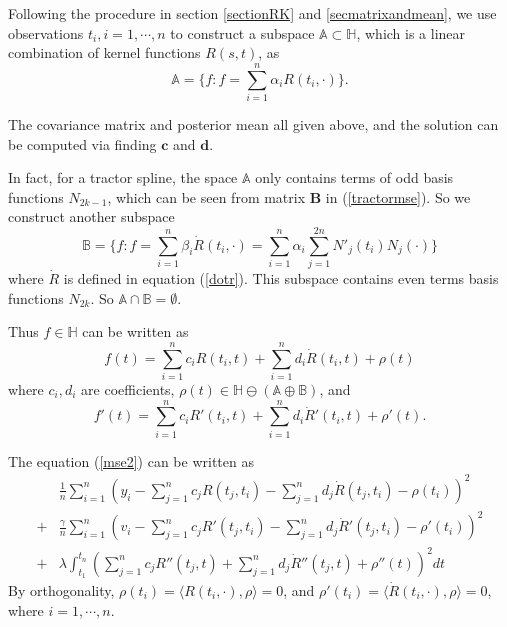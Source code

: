 Following the procedure in section \ref{sectionRK} and \ref{secmatrixandmean}, we use observations $t_i, i=1, \cdots, n$ to construct a subspace $\mathbb{A}\subset\mathbb{H}$, which is a linear combination of kernel functions $R(s,t)$, as
\begin{equation}
\mathbb{A}=\{f: f=\sum_{i=1}^{n}\alpha_iR(t_i,\cdot)\}.
\end{equation}

The covariance matrix and posterior mean all given above, and the solution can be computed via finding $\mathbf{c}$ and $\mathbf{d}$.

In fact, for a tractor spline, the space $\mathbb{A}$ only contains terms of odd basis functions $N_{2k-1}$, which can be seen from matrix $\mathbf{B}$ in (\ref{tractormse}). So we construct another subspace
\begin{equation}
\mathbb{B}=\{f: f=\sum_{i=1}^{n}\beta_i \dot{R}(t_i,\cdot)=\sum_{i=1}^{n}\alpha_i \sum_{j=1}^{2n}N'_j(t_i)N_j(\cdot)\} 
\end{equation}
where $\dot{R}$ is defined in equation (\ref{dotr}). This subspace contains even terms basis functions $N_{2k}$. So $\mathbb{A} \cap \mathbb{B} = \emptyset$. 

Thus $f \in \mathbb{H}$ can be written as
\begin{equation}\label{etaeq3}
f(t)=\sum_{i=1}^{n}c_iR(t_i,t)+\sum_{i=1}^{n}d_i \dot{R}(t_i,t)+\rho(t)
\end{equation}
where $c_i, d_i$ are coefficients, $\rho(t) \in \mathbb{H} \ominus (\mathbb{A} \oplus \mathbb{B})$, and 
\begin{equation}\label{etaeq4}
f'(t)=\sum_{i=1}^{n}c_iR'(t_i,t)+\sum_{i=1}^{n}d_i \dot{R}'(t_i,t)+\rho'(t).
\end{equation}

The equation (\ref{mse2}) can be written as
\begin{equation}
\begin{split}
&\frac{1}{n}\sum_{i=1}^n (y_i -\sum_{j=1}^{n}c_jR(t_j,t_i)- \sum_{j=1}^{n}d_j\dot{R}(t_j,t_i) -\rho(t_i))^2\\
+&\frac{\gamma}{n}\sum_{i=1}^n (v_i -\sum_{j=1}^{n}c_jR'(t_j,t_i)- \sum_{j=1}^{n}d_j\dot{R}'(t_j,t_i) -\rho'(t_i))^2\\
+&\lambda \int_{t_1}^{t_n} (\sum_{j=1}^{n}c_jR''(t_j,t)+ \sum_{j=1}^{n}d_j\dot{R}''(t_j,t) +\rho''(t))^2dt
\end{split}
\end{equation}
By orthogonality, $\rho(t_i) = \langle R(t_i,\cdot),\rho\rangle=0$, %
and $\rho'(t_i) = \langle\dot{R}(t_i,\cdot),\rho\rangle=0$, where $i=1,\cdots,n$. 

